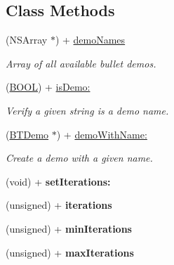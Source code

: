 \subsection*{Class Methods}
\begin{DoxyCompactItemize}
\item 
\hypertarget{interface_b_t_demo_afda441e8c7341759a43ad17819c505f1}{(N\+S\+Array $\ast$) + \hyperlink{interface_b_t_demo_afda441e8c7341759a43ad17819c505f1}{demo\+Names}}\label{interface_b_t_demo_afda441e8c7341759a43ad17819c505f1}

\begin{DoxyCompactList}\small\item\em Array of all available bullet demos. \end{DoxyCompactList}\item 
\hypertarget{interface_b_t_demo_a226d14f2d63c7f4131622481be44e34b}{(\hyperlink{_ice_types_8h_a050c65e107f0c828f856a231f4b4e788}{B\+O\+O\+L}) + \hyperlink{interface_b_t_demo_a226d14f2d63c7f4131622481be44e34b}{is\+Demo\+:}}\label{interface_b_t_demo_a226d14f2d63c7f4131622481be44e34b}

\begin{DoxyCompactList}\small\item\em Verify a given string is a demo name. \end{DoxyCompactList}\item 
(\hyperlink{interface_b_t_demo}{B\+T\+Demo} $\ast$) + \hyperlink{interface_b_t_demo_ae7fc92c835fbbf67a83ac9949eadf86f}{demo\+With\+Name\+:}
\begin{DoxyCompactList}\small\item\em Create a demo with a given name. \end{DoxyCompactList}\item 
\hypertarget{interface_b_t_demo_af38417afaff4cdc614e34bdb11f9558f}{(void) + {\bfseries set\+Iterations\+:}}\label{interface_b_t_demo_af38417afaff4cdc614e34bdb11f9558f}

\item 
\hypertarget{interface_b_t_demo_ab5a92a9d2652a75f89c8bac074765b09}{(unsigned) + {\bfseries iterations}}\label{interface_b_t_demo_ab5a92a9d2652a75f89c8bac074765b09}

\item 
\hypertarget{interface_b_t_demo_a03c143bd47f2673ad1f1037579397b18}{(unsigned) + {\bfseries min\+Iterations}}\label{interface_b_t_demo_a03c143bd47f2673ad1f1037579397b18}

\item 
\hypertarget{interface_b_t_demo_ae1320577a284084b6a8db6153be9aeed}{(unsigned) + {\bfseries max\+Iterations}}\label{interface_b_t_demo_ae1320577a284084b6a8db6153be9aeed}


\end{DoxyCompactItemize}
